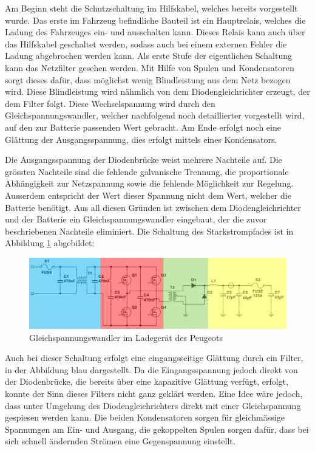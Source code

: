 Am Beginn steht die Schutzschaltung im Hilfskabel, welches bereits vorgestellt wurde. Das erste im Fahrzeug befindliche Bauteil ist ein Hauptrelais, welches die Ladung des Fahrzeuges ein- und ausschalten kann. Dieses Relais kann auch über das Hilfskabel geschaltet werden, sodass auch bei einem externen Fehler die Ladung abgebrochen werden kann. Als erste Stufe der eigentlichen Schaltung kann das Netzfilter gesehen werden. Mit Hilfe von Spulen und Kondensatoren sorgt dieses dafür, dass möglichst wenig Blindleistung aus dem Netz bezogen wird. Diese Blindleistung wird nähmlich von dem Diodengleichrichter erzeugt, der dem Filter folgt. Diese Wechselspannung wird durch den Gleichspannungswandler, welcher nachfolgend noch detaillierter vorgestellt wird, auf den zur Batterie passenden Wert gebracht. Am Ende erfolgt noch eine Glättung der Ausgangsspannung, dies erfolgt mittels eines Kondensators.

Die Ausgangsspannung der Diodenbrücke weist mehrere Nachteile auf. Die grössten Nachteile sind die fehlende galvanische Trennung, die proportionale Abhängigkeit zur Netzspannung sowie die fehlende Möglichkeit zur Regelung. Ausserdem entspricht der Wert dieser Spannung nicht dem Wert, welcher die Batterie benötigt. Aus all diesen Gründen ist zwischen dem Diodengleichrichter und der Batterie ein Gleichspannungswandler eingebaut, der die zuvor beschriebenen Nachteile eliminiert. Die Schaltung des Starkstrompfades ist in Abbildung \ref{fig:Ladegeraet_Peugeot} abgebildet:

\begin{figure}[h]
	\centering
		\includegraphics[width=1.00\textwidth]{images/Ladegeraet_Peugeot.PNG}
	\caption{Gleichspannungswandler im Ladegerät des Peugeots}
	\label{fig:Ladegeraet_Peugeot}
\end{figure}

Auch bei dieser Schaltung erfolgt eine eingangsseitige Glättung durch ein Filter, in der Abbildung blau dargestellt. Da die Eingangsspannung jedoch direkt von der Diodenbrücke, die bereits über eine kapazitive Glättung verfügt, erfolgt, konnte der Sinn dieses Filters nicht ganz geklärt werden. Eine Idee wäre jedoch, dass unter Umgehung des Diodengleichrichters direkt mit einer Gleichspannung gespiesen werden kann. Die beiden Kondensatoren sorgen für gleichmässige Spannungen am Ein- und Ausgang, die gekoppelten Spulen sorgen dafür, dass bei sich schnell ändernden Strömen eine Gegenspannung einstellt.

